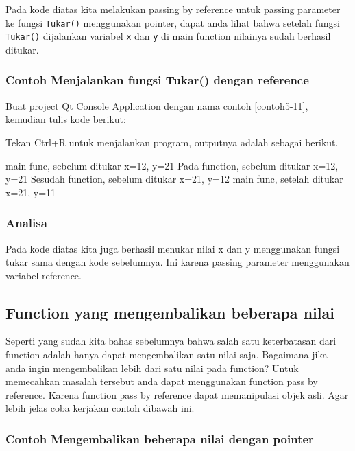 Pada kode diatas kita melakukan passing by reference untuk passing
parameter ke fungsi \texttt{Tukar()} menggunakan pointer, dapat anda
lihat bahwa setelah fungsi \texttt{Tukar()} dijalankan variabel
\texttt{x} dan \texttt{y} di main function nilainya sudah berhasil
ditukar.

\subsubsection*{Contoh  Menjalankan fungsi Tukar() dengan reference}

Buat project Qt Console Application dengan nama contoh \ref{contoh5-11}, kemudian
tulis kode berikut:



Tekan Ctrl+R untuk menjalankan program, outputnya adalah sebagai
berikut.

\begin{lcverbatim}
main func, sebelum ditukar x=12, y=21
Pada function, sebelum ditukar x=12, y=21
Sesudah function, sebelum ditukar x=21, y=12
main func, setelah ditukar x=21, y=11
\end{lcverbatim}

\subsubsection*{Analisa}

Pada kode diatas kita juga berhasil menukar nilai x dan y menggunakan
fungsi tukar sama dengan kode sebelumnya. Ini karena passing parameter
menggunakan variabel reference.

\subsection{Function yang mengembalikan beberapa nilai}\label{function-yang-mengembalikan-beberapa-nilai}

Seperti yang sudah kita bahas sebelumnya bahwa salah satu keterbatasan
dari function adalah hanya dapat mengembalikan satu nilai saja.
Bagaimana jika anda ingin mengembalikan lebih dari satu nilai pada
function? Untuk memecahkan masalah tersebut anda dapat menggunakan
function pass by reference. Karena function pass by reference dapat
memanipulasi objek asli. Agar lebih jelas coba kerjakan contoh dibawah
ini.

\subsubsection*{Contoh  Mengembalikan beberapa nilai dengan pointer}

